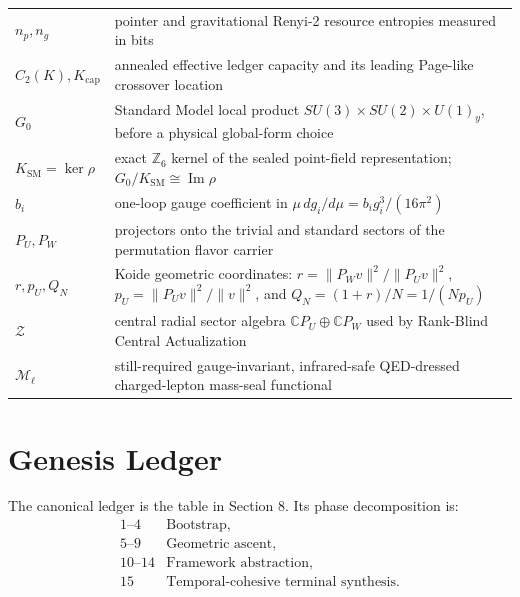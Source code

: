 \documentclass[11pt]{article}
\theoremstyle{plain}
\theoremstyle{definition}
\theoremstyle{remark}
\begin{document}
\begin{longtable}{@{}>{\raggedright\arraybackslash}p{}>{\raggedright\arraybackslash}p{}@{}}
\(n_p,n_g\) & pointer and gravitational Renyi-2 resource entropies measured in bits \\
\(C_2(K),K_{\mathrm{cap}}\) & annealed effective ledger capacity and its leading Page-like crossover location \\
\(G_0\) & Standard Model local product \(SU(3)\times SU(2)\times U(1)_y\), before a physical global-form choice \\
\(K_{\mathrm{SM}}=\ker\rho\) & exact \(\mathbb Z_6\) kernel of the sealed point-field representation; \(G_0/K_{\mathrm{SM}}\cong\operatorname{Im}\rho\) \\
\(b_i\) & one-loop gauge coefficient in \(\mu\,dg_i/d\mu=b_i g_i^3/(16\pi^2)\) \\
\(P_U,P_W\) & projectors onto the trivial and standard sectors of the permutation flavor carrier \\
\(r,p_U,Q_N\) & Koide geometric coordinates: \(r=\|P_Wv\|^2/\|P_Uv\|^2\), \(p_U=\|P_Uv\|^2/\|v\|^2\), and \(Q_N=(1+r)/N=1/(Np_U)\) \\
\(\mathcal Z\) & central radial sector algebra \(\mathbb C P_U\oplus\mathbb C P_W\) used by Rank-Blind Central Actualization \\
\(\mathcal M_\ell\) & still-required gauge-invariant, infrared-safe QED-dressed charged-lepton mass-seal functional \\
\bottomrule
\end{longtable}

\section{Genesis Ledger}

The canonical ledger is the table in Section 8. Its phase decomposition is:
\[
\begin{array}{ll}
1\text{--}4 & \text{Bootstrap},\\
5\text{--}9 & \text{Geometric ascent},\\
10\text{--}14 & \text{Framework abstraction},\\
15 & \text{Temporal-cohesive terminal synthesis}.
\end{array}
\]
\end{document}
